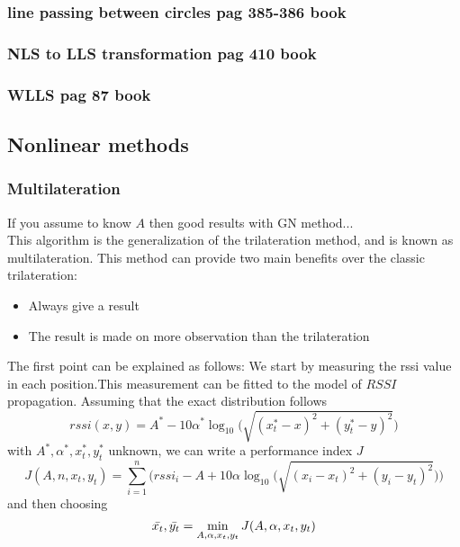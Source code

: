 \documentclass[12pt]{article}
\begin{document}
\subsubsection{line passing between circles pag 385-386 book}
\subsubsection{NLS to LLS transformation pag 410 book}
\subsubsection{WLLS pag 87 book}

\clearpage

\subsection{Nonlinear methods}
\subsubsection{Multilateration}
If you assume to know $A$ then good results with GN method...\\
This algorithm is the generalization of the trilateration method, and is known as multilateration. 
This method can provide two main benefits over the classic trilateration:
\begin{itemize}
    \item Always give a result
    \item The result is made on more observation than the trilateration
\end{itemize}
The first point can be explained as follows:
We start by measuring the rssi value in each position.This measurement can be fitted to the model of $RSSI$ propagation. Assuming that the exact distribution follows 
\begin{equation}
rssi(x,y)=A^*-10\alpha^*\log_{10}\big(\sqrt{(x_t^*-x)^2+(y_t^*-y)^2}\big)    
\end{equation}
with $A^*,\alpha^*,x^*_t,y^*_t$ unknown, we can write a performance index $J$
\begin{equation}
    J(A,n,x_t,y_t)=\sum_{i=1}^n\bigg(rssi_i-A+10\alpha\log_{10}\big(\sqrt{(x_i-x_t)^2+(y_i-y_t)^2}\big)\bigg)
\end{equation}
and then choosing 
\begin{equation}
\Bar{x_t}, \Bar{y_t}=\min_{A,\alpha,x_t,y_t}J(A,\alpha,x_t,y_t)
\end{equation}
\end{document}
